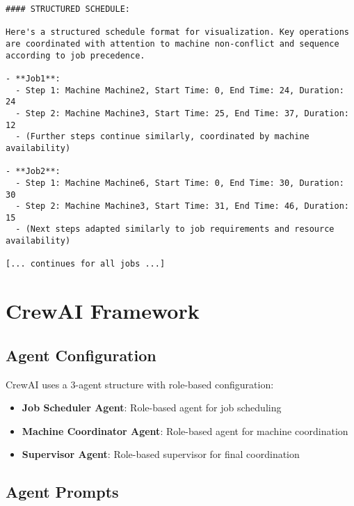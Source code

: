 \documentclass[11pt]{article}
\begin{document}
\begin{lstlisting}[caption=AutoGen Output Example]
#### STRUCTURED SCHEDULE:

Here's a structured schedule format for visualization. Key operations are coordinated with attention to machine non-conflict and sequence according to job precedence.

- **Job1**:
  - Step 1: Machine Machine2, Start Time: 0, End Time: 24, Duration: 24
  - Step 2: Machine Machine3, Start Time: 25, End Time: 37, Duration: 12
  - (Further steps continue similarly, coordinated by machine availability)

- **Job2**:
  - Step 1: Machine Machine6, Start Time: 0, End Time: 30, Duration: 30
  - Step 2: Machine Machine3, Start Time: 31, End Time: 46, Duration: 15
  - (Next steps adapted similarly to job requirements and resource availability)

[... continues for all jobs ...]
\end{lstlisting}

\section{CrewAI Framework}

\subsection{Agent Configuration}

CrewAI uses a 3-agent structure with role-based configuration:

\begin{itemize}
    \item \textbf{Job Scheduler Agent}: Role-based agent for job scheduling
    \item \textbf{Machine Coordinator Agent}: Role-based agent for machine coordination  
    \item \textbf{Supervisor Agent}: Role-based supervisor for final coordination
\end{itemize}

\subsection{Agent Prompts}
\end{document}
